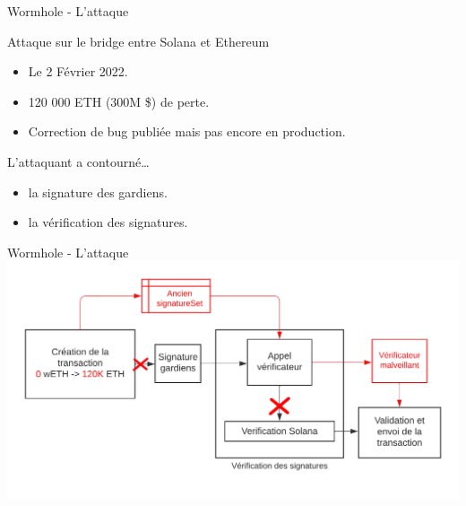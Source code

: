 \begin{frame}{Wormhole - L'attaque}
    \begin{block}{Attaque sur le bridge entre Solana et Ethereum}
        \begin{itemize}
            \item Le 2 Février 2022.
            \item 120 000 ETH (300M \$) de perte.
            \item Correction de bug publiée mais pas encore en production.
        \end{itemize}
    \end{block}
    \begin{block}{L'attaquant a contourné\dots}
        \begin{itemize}
            \item la signature des gardiens.
            \item la vérification des signatures. 
        \end{itemize}
    \end{block}
\end{frame}

\begin{frame}{Wormhole - L'attaque}
    \centering
    \includegraphics[scale=0.69]{centralisation/img/wormhole/worm_hack.png}
\end{frame}




